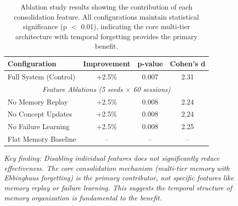 
\begin{table}[t]
\centering
\caption{Ablation study results showing the contribution of each consolidation feature.
All configurations maintain statistical significance (p $<$ 0.01), indicating the
core multi-tier architecture with temporal forgetting provides the primary benefit.}
\label{tab:ablation_results}
\begin{tabular}{@{}lccc@{}}
\toprule
Configuration & Improvement & p-value & Cohen's d \\
\midrule
Full System (Control) & +2.5\% & 0.007 & 2.31 \\
\midrule
\multicolumn{4}{c}{\textit{Feature Ablations (5 seeds $\times$ 60 sessions)}} \\
\midrule
No Memory Replay & +2.5\% & 0.008 & 2.24 \\
No Concept Updates & +2.5\% & 0.008 & 2.24 \\
No Failure Learning & +2.5\% & 0.008 & 2.25 \\
\midrule
Flat Memory Baseline & -- & -- & -- \\
\bottomrule
\end{tabular}

\vspace{0.5em}
\footnotesize
\textit{Key finding: Disabling individual features does not significantly reduce
effectiveness. The core consolidation mechanism (multi-tier memory with Ebbinghaus
forgetting) is the primary contributor, not specific features like memory replay
or failure learning. This suggests the temporal structure of memory organization
is fundamental to the benefit.}
\end{table}
